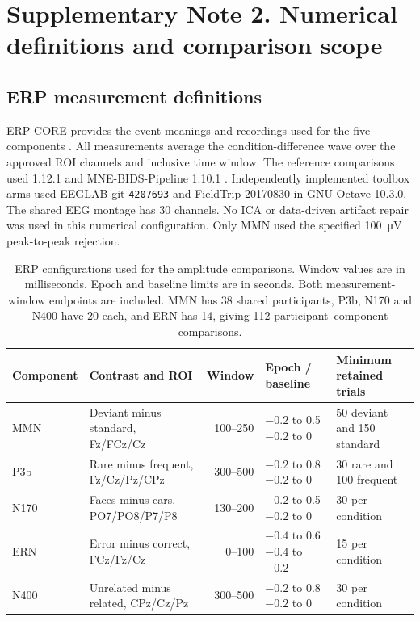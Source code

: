 \section*{Supplementary Note 2. Numerical definitions and comparison scope}
\label{si:numerical}

\subsection*{ERP measurement definitions}
ERP CORE provides the event meanings and recordings used for the five components \citep{Kappenman2021}. All measurements average the condition-difference wave over the approved ROI channels and inclusive time window. The reference comparisons used \mne{} 1.12.1 and MNE-BIDS-Pipeline 1.10.1 \citep{MNEBIDSPipeline}. Independently implemented toolbox arms used EEGLAB git \texttt{4207693} and FieldTrip 20170830 in GNU Octave 10.3.0. The shared EEG montage has 30 channels. No ICA or data-driven artifact repair was used in this numerical configuration. Only MMN used the specified \SI{100}{\micro\volt} peak-to-peak rejection.

\begin{table}[!htbp]
\centering\small
\caption{ERP configurations used for the amplitude comparisons. Window values are in milliseconds. Epoch and baseline limits are in seconds. Both measurement-window endpoints are included. MMN has 38 shared participants, P3b, N170 and N400 have 20 each, and ERN has 14, giving 112 participant--component comparisons.}
\label{tab:si-erp-spec}
\begin{tabularx}{\linewidth}{@{}l X r l X@{}}
\toprule
Component & Contrast and ROI & Window & Epoch / baseline & Minimum retained trials\\
\midrule
MMN & Deviant minus standard, Fz/FCz/Cz & 100--250 & \shortstack[l]{\(-0.2\) to 0.5\\\(-0.2\) to 0} & 50 deviant and 150 standard\\
P3b & Rare minus frequent, Fz/Cz/Pz/CPz & 300--500 & \shortstack[l]{\(-0.2\) to 0.8\\\(-0.2\) to 0} & 30 rare and 100 frequent\\
N170 & Faces minus cars, PO7/PO8/P7/P8 & 130--200 & \shortstack[l]{\(-0.2\) to 0.5\\\(-0.2\) to 0} & 30 per condition\\
ERN & Error minus correct, FCz/Fz/Cz & 0--100 & \shortstack[l]{\(-0.4\) to 0.6\\\(-0.4\) to \(-0.2\)} & 15 per condition\\
N400 & Unrelated minus related, CPz/Cz/Pz & 300--500 & \shortstack[l]{\(-0.2\) to 0.8\\\(-0.2\) to 0} & 30 per condition\\
\bottomrule
\end{tabularx}
\end{table}


